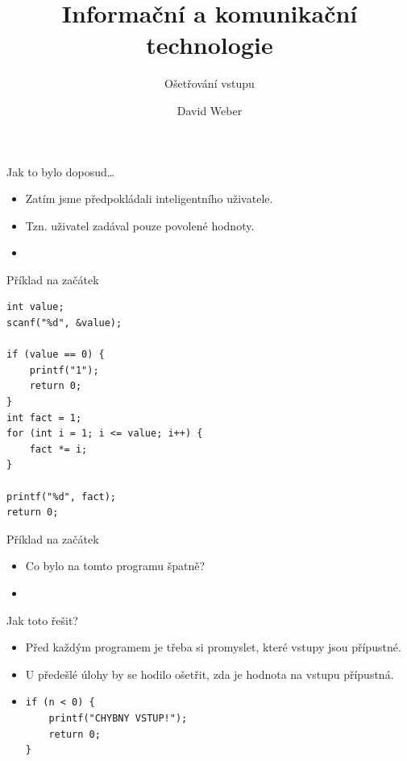 \documentclass[14pt,aspectratio=169]{beamer}
\title{Informační a komunikační technologie}
\subtitle{Ošetřování vstupu}
\author{David Weber}
\begin{document}

    \begin{frame}
        \titlepage
    \end{frame}

    \begin{frame}[t,fragile]{Jak to bylo doposud\dots}
        \begin{itemize}
            \item Zatím jsme předpokládali inteligentního uživatele.
            \item Tzn. uživatel zadával pouze povolené hodnoty.
            \item {}
        \end{itemize}
    \end{frame}

    \begin{frame}[t,fragile]{Příklad na začátek}
        \begin{lstlisting}
int value;
scanf("%d", &value);

if (value == 0) {
    printf("1");
    return 0;
}
int fact = 1;
for (int i = 1; i <= value; i++) {
    fact *= i;
}

printf("%d", fact);
return 0;
        \end{lstlisting}
    \end{frame}

    \begin{frame}[t]{Příklad na začátek}
        \begin{itemize}
            \item Co bylo na tomto programu špatně?
            \item {}
        \end{itemize}
    \end{frame}

    \begin{frame}[t,fragile]{Jak toto řešit?}
        \begin{itemize}
            \item Před každým programem je třeba si promyslet, které vstupy jsou přípustné.
            \item U předešlé úlohy by se hodilo ošetřit, zda je hodnota na vstupu přípustná.
            \item {}
            \begin{lstlisting}
if (n < 0) {
    printf("CHYBNY VSTUP!");
    return 0;
}
            \end{lstlisting}
        \end{itemize}
    \end{frame}
\end{document}
